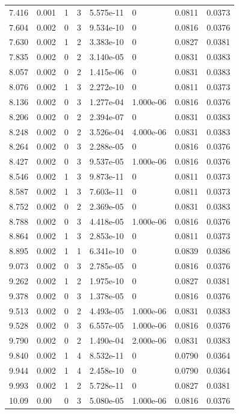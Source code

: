 \documentclass[preview]{standalone}
\begin{document}
{{{\begin{tabular}{L{1.2cm}C{1.2cm} C{0.3cm}C{0.5cm} C{1.4cm}C{1.4cm} C{1.4cm}C{1.4cm}}
  7.416  &  0.001  & 1     &  3 &  5.575e-11  & 0  & 0.0811 &  0.0373   \\ 
  7.604  &  0.002  & 0     &  3 &  9.534e-10  & 0  & 0.0816 &  0.0376   \\ 
  7.630  &  0.002  & 1     &  2 &  3.383e-10  & 0  & 0.0827 &  0.0381   \\ 
  7.835  &  0.002  & 0     &  2 &  3.140e-05  & 0  & 0.0831 &  0.0383   \\ 
  8.057  &  0.002  & 0     &  2 &  1.415e-06  & 0  & 0.0831 &  0.0383   \\ 
  8.076  &  0.002  & 1     &  3 &  2.272e-10  & 0  & 0.0811 &  0.0373   \\ 
  8.136  &  0.002  & 0     &  3 &  1.277e-04  & 1.000e-06  & 0.0816 &  0.0376   \\ 
  8.206  &  0.002  & 0     &  2 &  2.394e-07  & 0  & 0.0831 &  0.0383   \\ 
  8.248  &  0.002  & 0     &  2 &  3.526e-04  & 4.000e-06  & 0.0831 &  0.0383   \\ 
  8.264  &  0.002  & 0     &  3 &  2.288e-05  & 0  & 0.0816 &  0.0376   \\ 
  8.427  &  0.002  & 0     &  3 &  9.537e-05  & 1.000e-06  & 0.0816 &  0.0376   \\ 
  8.546  &  0.002  & 1     &  3 &  9.873e-11  & 0  & 0.0811 &  0.0373   \\ 
  8.587  &  0.002  & 1     &  3 &  7.603e-11  & 0  & 0.0811 &  0.0373   \\ 
  8.752  &  0.002  & 0     &  2 &  2.369e-05  & 0  & 0.0831 &  0.0383   \\ 
  8.788  &  0.002  & 0     &  3 &  4.418e-05  & 1.000e-06  & 0.0816 &  0.0376   \\ 
  8.864  &  0.002  & 1     &  3 &  2.853e-10  & 0  & 0.0811 &  0.0373   \\ 
  8.895  &  0.002  & 1     &  1 &  6.341e-10  & 0  & 0.0839 &  0.0386   \\ 
  9.073  &  0.002  & 0     &  3 &  2.785e-05  & 0  & 0.0816 &  0.0376   \\ 
  9.262  &  0.002  & 1     &  2 &  1.975e-10  & 0  & 0.0827 &  0.0381   \\ 
  9.378  &  0.002  & 0     &  3 &  1.378e-05  & 0  & 0.0816 &  0.0376   \\ 
  9.513  &  0.002  & 0     &  2 &  4.493e-05  & 1.000e-06  & 0.0831 &  0.0383   \\ 
  9.528  &  0.002  & 0     &  3 &  6.557e-05  & 1.000e-06  & 0.0816 &  0.0376   \\ 
  9.790  &  0.002  & 0     &  2 &  1.490e-04  & 2.000e-06  & 0.0831 &  0.0383   \\ 
  9.840  &  0.002  & 1     &  4 &  8.532e-11  & 0  & 0.0790 &  0.0364   \\ 
  9.944  &  0.002  & 1     &  4 &  2.458e-10  & 0  & 0.0790 &  0.0364   \\ 
  9.993  &  0.002  & 1     &  2 &  5.728e-11  & 0  & 0.0827 &  0.0381   \\ 
  10.09  &  0.00  & 0     &  3 &  5.080e-05  & 1.000e-06  & 0.0816 &  0.0376   \\ 
\hline 
\end{tabular} 

}}}
\end{document}
